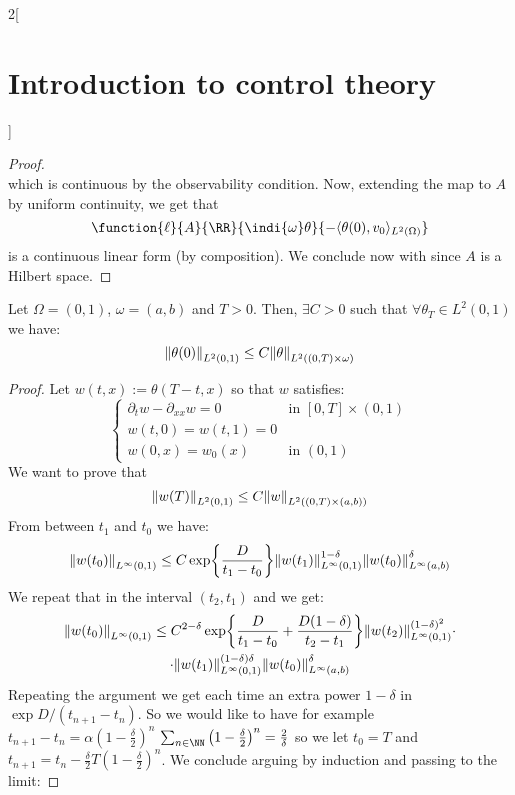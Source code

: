 \documentclass[../../../main_math.tex]{subfiles}
\begin{document}
\begin{multicols}{2}[\section{Introduction to control theory}]
\begin{proof}
$$    $$
    which is continuous by the observability condition. Now, extending the map to $A$ by uniform continuity, we get that
    $$
      \function{\ell}{A}{\RR}{\indi{\omega}\theta}{-\langle \theta(0),v_0\rangle_{L^2(\Omega)}}
    $$
    is a continuous linear form (by composition). We conclude now with  since $A$ is a Hilbert space.
  \end{proof}
  \begin{proposition}
    Let $\Omega=(0,1)$, $\omega=(a,b)$ and $T>0$. Then, $\exists C>0$ such that $\forall \theta_T\in L^2(0,1)$ we have:
    $$
      \norm{\theta(0)}_{L^2(0,1)}\leq C\norm{\theta}_{L^2((0,T)\times \omega)}
    $$
  \end{proposition}
  \begin{proof}
    Let $w(t,x):=\theta(T-t,x)$ so that $w$ satisfies:
    \begin{equation}\label{ICT:heat_equation_control_dual_1D}
      \begin{cases}
        \partial_t w - \partial_{xx} w = 0 & \text{in } [0,T]\times (0,1) \\
        w(t,0) = w(t,1) = 0                &                              \\
        w(0,x) = w_0(x)                    & \text{in } (0,1)
      \end{cases}
    \end{equation}
    We want to prove that $$
      \norm{w(T)}_{L^2(0,1)}\leq C\norm{w}_{L^2((0,T)\times (a,b))}
    $$
    From  between $t_1$ and $t_0$ we have:
    $$
      \norm{w(t_0)}_{L^\infty(0,1)}\leq C\exp{\frac{D}{t_1-t_0}}\norm{w(t_1)}_{L^\infty(0,1)}^{1-\delta}\norm{w(t_0)}_{L^\infty(a,b)}^\delta
    $$
    We repeat that in the interval $(t_2,t_1)$ and we get:
    \begin{multline*}
      \norm{w(t_0)}_{L^\infty(0,1)}\leq C^{2-\delta}\exp{\frac{D}{t_1-t_0}+\frac{D(1-\delta)}{t_2-t_1}}\norm{w(t_2)}_{L^\infty(0,1)}^{(1-\delta)^2}\cdot\\\cdot\norm{w(t_1)}_{L^\infty(0,1)}^{(1-\delta)\delta}\norm{w(t_0)}_{L^\infty(a,b)}^{\delta}
    \end{multline*}
    Repeating the argument we get each time an extra power $1-\delta$ in $\exp{D/(t_{n+1}-t_n)}$. So we would like to have for example $t_{n+1}-t_n=\alpha \left(1-\frac{\delta}{2}\right)^n$ $\sum_{n\in\NN} \left(1-\frac{\delta}{2}\right)^n = \frac{2}{\delta}$ so we let $t_0=T$ and $t_{n+1}=t_n-\frac{\delta}{2}T\left(1-\frac{\delta}{2}\right)^n$. We conclude arguing by induction and passing to the limit:

\end{proof}
\end{multicols}
\end{document}
